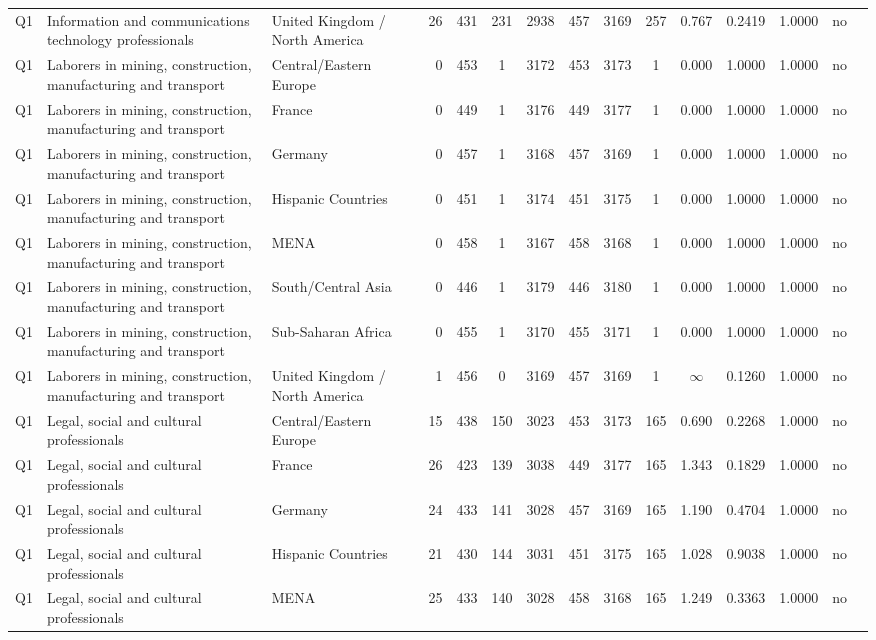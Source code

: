 \begin{longtable}{lllrcccccccccll}
Q1 & Information and communications technology professionals & United Kingdom / North America & 26 & 431 & 231 & 2938 & 457 & 3169 & 257 & 0.767 & 0.2419 & 1.0000 & no \\
Q1 & Laborers in mining, construction, manufacturing and transport & Central/Eastern Europe & 0 & 453 & 1 & 3172 & 453 & 3173 & 1 & 0.000 & 1.0000 & 1.0000 & no \\
Q1 & Laborers in mining, construction, manufacturing and transport & France & 0 & 449 & 1 & 3176 & 449 & 3177 & 1 & 0.000 & 1.0000 & 1.0000 & no \\
Q1 & Laborers in mining, construction, manufacturing and transport & Germany & 0 & 457 & 1 & 3168 & 457 & 3169 & 1 & 0.000 & 1.0000 & 1.0000 & no \\
Q1 & Laborers in mining, construction, manufacturing and transport & Hispanic Countries & 0 & 451 & 1 & 3174 & 451 & 3175 & 1 & 0.000 & 1.0000 & 1.0000 & no \\
Q1 & Laborers in mining, construction, manufacturing and transport & MENA & 0 & 458 & 1 & 3167 & 458 & 3168 & 1 & 0.000 & 1.0000 & 1.0000 & no \\
Q1 & Laborers in mining, construction, manufacturing and transport & South/Central Asia & 0 & 446 & 1 & 3179 & 446 & 3180 & 1 & 0.000 & 1.0000 & 1.0000 & no \\
Q1 & Laborers in mining, construction, manufacturing and transport & Sub-Saharan Africa & 0 & 455 & 1 & 3170 & 455 & 3171 & 1 & 0.000 & 1.0000 & 1.0000 & no \\
Q1 & Laborers in mining, construction, manufacturing and transport & United Kingdom / North America & 1 & 456 & 0 & 3169 & 457 & 3169 & 1 & $\infty$ & 0.1260 & 1.0000 & no \\
Q1 & Legal, social and cultural professionals & Central/Eastern Europe & 15 & 438 & 150 & 3023 & 453 & 3173 & 165 & 0.690 & 0.2268 & 1.0000 & no \\
Q1 & Legal, social and cultural professionals & France & 26 & 423 & 139 & 3038 & 449 & 3177 & 165 & 1.343 & 0.1829 & 1.0000 & no \\
Q1 & Legal, social and cultural professionals & Germany & 24 & 433 & 141 & 3028 & 457 & 3169 & 165 & 1.190 & 0.4704 & 1.0000 & no \\
Q1 & Legal, social and cultural professionals & Hispanic Countries & 21 & 430 & 144 & 3031 & 451 & 3175 & 165 & 1.028 & 0.9038 & 1.0000 & no \\
Q1 & Legal, social and cultural professionals & MENA & 25 & 433 & 140 & 3028 & 458 & 3168 & 165 & 1.249 & 0.3363 & 1.0000 & no \\

\end{longtable}
